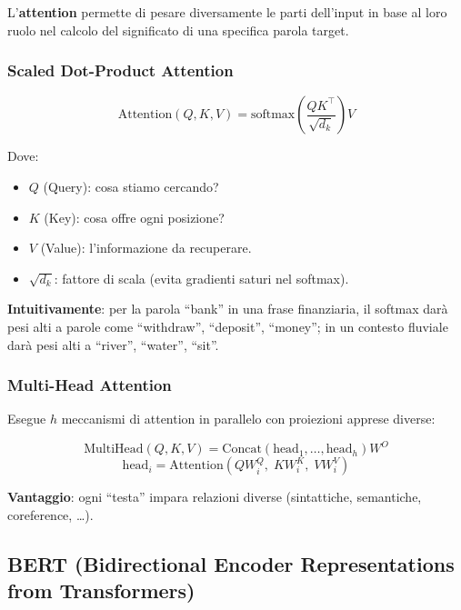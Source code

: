\documentclass[12pt,a4paper]{article}
\begin{document}
\begin{defbox}
L'\textbf{attention} permette di pesare diversamente le parti dell'input in base al loro ruolo nel calcolo del significato di una specifica parola target.
\end{defbox}

\subsubsection{Scaled Dot-Product Attention}

\begin{formulabox}
\[
\text{Attention}(Q, K, V) = \text{softmax}\!\left(\frac{QK^\top}{\sqrt{d_k}}\right) V
\]
\end{formulabox}

Dove:
\begin{itemize}[leftmargin=1.5em]
  \item $Q$ (Query): cosa stiamo cercando?
  \item $K$ (Key): cosa offre ogni posizione?
  \item $V$ (Value): l'informazione da recuperare.
  \item $\sqrt{d_k}$: fattore di scala (evita gradienti saturi nel softmax).
\end{itemize}

\textbf{Intuitivamente}: per la parola ``bank'' in una frase finanziaria, il softmax darà pesi alti a parole come ``withdraw'', ``deposit'', ``money''; in un contesto fluviale darà pesi alti a ``river'', ``water'', ``sit''.

\subsubsection{Multi-Head Attention}

Esegue $h$ meccanismi di attention in parallelo con proiezioni apprese diverse:

\begin{formulabox}
\[
\text{MultiHead}(Q, K, V) = \text{Concat}(\text{head}_1, \dots, \text{head}_h) W^O
\]
\[
\text{head}_i = \text{Attention}(Q W^Q_i,\; K W^K_i,\; V W^V_i)
\]
\end{formulabox}

\textbf{Vantaggio}: ogni ``testa'' impara relazioni diverse (sintattiche, semantiche, coreference, \ldots).

\subsection{BERT (Bidirectional Encoder Representations from Transformers)}
\end{document}
